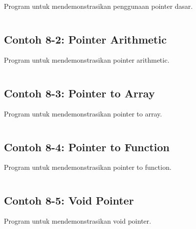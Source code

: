 Program untuk mendemonstrasikan penggunaan pointer dasar.

\begin{lstlisting}[language=c++, caption=Basic Pointer]

\end{lstlisting}

\subsection{Contoh 8-2: Pointer Arithmetic}

Program untuk mendemonstrasikan pointer arithmetic.

\begin{lstlisting}[language=c++, caption=Pointer Arithmetic]

\end{lstlisting}

\subsection{Contoh 8-3: Pointer to Array}

Program untuk mendemonstrasikan pointer to array.

\begin{lstlisting}[language=c++, caption=Pointer to Array]

\end{lstlisting}

\subsection{Contoh 8-4: Pointer to Function}

Program untuk mendemonstrasikan pointer to function.

\begin{lstlisting}[language=c++, caption=Pointer to Function]

\end{lstlisting}

\subsection{Contoh 8-5: Void Pointer}

Program untuk mendemonstrasikan void pointer.

\begin{lstlisting}[language=c++, caption=Void Pointer]

\end{lstlisting}

